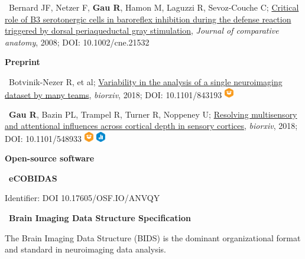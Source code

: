 \documentclass[a4paper,12pt,oneside]{letter}
\begin{document}
{\textbullet~Bernard JF, Netzer F, \textbf{Gau R}, Hamon M, Laguzzi R, Sevoz-Couche C; 
\href{http://www.researchgate.net/profile/Remi_Gau/publication/5856955_Critical_role_of_B3_serotonergic_cells_in_baroreflex_inhibition_during_the_defense_reaction_triggered_by_dorsal_periaqueductal_gray_stimulation/links/586bf81d08ae6eb871bb6f47.pdf}{Critical role of B3 serotonergic cells in baroreflex inhibition during the defense reaction triggered by dorsal periaqueductal gray stimulation}, \textit{Journal of comparative anatomy}, 2008; DOI: 10.1002/cne.21532

\begin{center}
 \large\textbf{Preprint}
 \end{center}
 
 \textbullet~Botvinik-Nezer R, et al; \href{https://doi.org/10.1101/843193}{Variability in the analysis of a single neuroimaging dataset by many teams}, \textit{biorxiv}, 2018; DOI: 10.1101/843193 \href{https://doi.org/10.5281/zenodo.3339821}{\includegraphics[width=0.4cm]{materials_small_color.png}}
 
 \textbullet~\textbf{Gau R}, Bazin PL, Trampel R, Turner R, Noppeney U; \href{https://www.biorxiv.org/content/10.1101/548933v1}{Resolving multisensory and attentional influences across cortical depth in sensory cortices}, \textit{biorxiv}, 2018; DOI: 10.1101/548933 \href{https://doi.org/10.5281/zenodo.3581319}{\includegraphics[width=0.4cm]{materials_small_color.png}} \href{https://osf.io/7ka5j/}{\includegraphics[width=0.4cm]{data_small_color.png}}
 
 
\begin{center}
 \large\textbf{Open-source software}
 \end{center} 
 
 
    \textbullet~\textbf{eCOBIDAS}
    
    

Identifier: DOI 10.17605/OSF.IO/ANVQY

    
    \textbullet~\textbf{Brain Imaging Data Structure Specification}
    
    The Brain Imaging Data Structure (BIDS) is the dominant organizational format and standard in neuroimaging data analysis.
    
}
\end{document}
